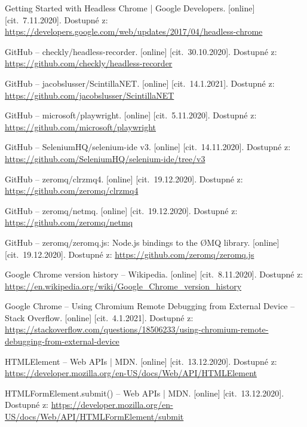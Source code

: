 \begin{flushleft}
\begin{thebibliography}{99}
 Getting Started with Headless Chrome | Google Developers. [online] [cit.~7.11.2020]. Dostupné z: \url{https://developers.google.com/web/updates/2017/04/headless-chrome}

 GitHub -- checkly/headless-recorder. [online] [cit.~30.10.2020]. Dostupné z: \url{https://github.com/checkly/headless-recorder}

 GitHub -- jacobslusser/ScintillaNET. [online] [cit.~14.1.2021]. Dostupné z: \url{https://github.com/jacobslusser/ScintillaNET}


 GitHub -- microsoft/playwright. [online] [cit.~5.11.2020]. Dostupné z: \url{https://github.com/microsoft/playwright}

 GitHub -- SeleniumHQ/selenium-ide v3. [online] [cit.~14.11.2020]. Dostupné z: \url{https://github.com/SeleniumHQ/selenium-ide/tree/v3}

 GitHub -- zeromq/clrzmq4. [online] [cit.~19.12.2020]. Dostupné z: \url{https://github.com/zeromq/clrzmq4}

 GitHub -- zeromq/netmq. [online] [cit.~19.12.2020]. Dostupné z: \url{https://github.com/zeromq/netmq}

 GitHub -- zeromq/zeromq.js: Node.js bindings to the ØMQ library. [online] [cit.~19.12.2020]. Dostupné z: \url{https://github.com/zeromq/zeromq.js}

 Google Chrome version history -- Wikipedia. [online] [cit.~8.11.2020]. Dostupné z: \url{https://en.wikipedia.org/wiki/Google_Chrome_version_history}

 Google Chrome -- Using Chromium Remote Debugging from External Device -- Stack Overflow. [online] [cit.~4.1.2021]. Dostupné z: \url{https://stackoverflow.com/questions/18506233/using-chromium-remote-debugging-from-external-device}

 HTMLElement -- Web APIs | MDN. [online] [cit.~13.12.2020]. Dostupné z: \url{https://developer.mozilla.org/en-US/docs/Web/API/HTMLElement}

 HTMLFormElement.submit() -- Web APIs | MDN. [online] [cit.~13.12.2020]. Dostupné z: \url{https://developer.mozilla.org/en-US/docs/Web/API/HTMLFormElement/submit}


\end{thebibliography}
\end{flushleft}
